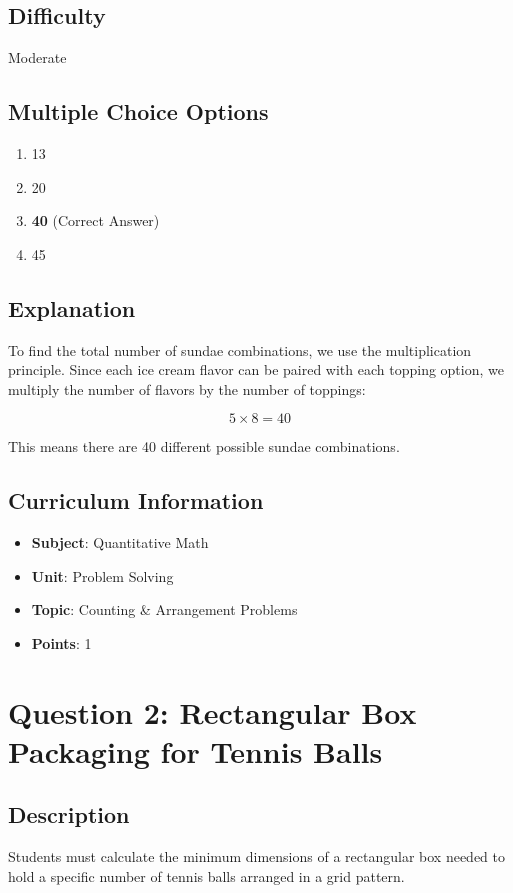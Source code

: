 \documentclass[12pt]{article}
\begin{document}
\subsection*{Difficulty}
Moderate

\subsection*{Multiple Choice Options}
\begin{enumerate}[label=(\Alph*)]
\item 13
\item 20
\item \textbf{40} \quad (Correct Answer)
\item 45
\end{enumerate}

\subsection*{Explanation}
To find the total number of sundae combinations, we use the multiplication principle. Since each ice cream flavor can be paired with each topping option, we multiply the number of flavors by the number of toppings:

$$5 \times 8 = 40$$

This means there are 40 different possible sundae combinations.

\subsection*{Curriculum Information}
\begin{itemize}
\item \textbf{Subject}: Quantitative Math
\item \textbf{Unit}: Problem Solving
\item \textbf{Topic}: Counting \& Arrangement Problems
\item \textbf{Points}: 1
\end{itemize}

\newpage

\section*{Question 2: Rectangular Box Packaging for Tennis Balls}

\subsection*{Description}
Students must calculate the minimum dimensions of a rectangular box needed to hold a specific number of tennis balls arranged in a grid pattern.
\end{document}
